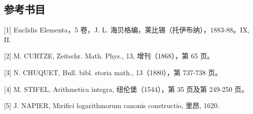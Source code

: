 \subsection*{参考书目}

{[}1{]} Euclidis Elementa，5 卷，J. L. 海贝格编，莱比锡（托伊布纳），1883-88。IX, II.

{[}2{]} M. CURTZE, Zeitschr. Math. Phys., 13, 增刊（1868），第 65 页。

{[}3{]} N. CHUQUET, Bull. bibl. storia math., 13（1880），第 737-738 页。

{[}4{]} M. STIFEL, Arithmetica integra, 纽伦堡（1544），第 35 页及第 249-250 页。

{[}5{]} J. NAPIER, Mirifici logarithmorum canonis constructio, 里昂, 1620.

